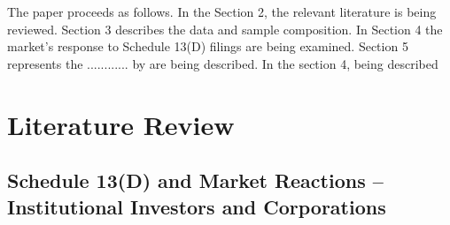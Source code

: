 \documentclass[12pt]{article}
\begin{document}
The paper proceeds as follows. In the Section 2, the relevant literature is being reviewed. Section 3 describes the data and sample composition. In Section 4 the market's response to Schedule 13(D) filings are being examined. Section 5 represents the ............
by  are being described.  In the section 4, being described 

\section{Literature Review}

\subsection{Schedule 13(D) and Market Reactions -- Institutional Investors and Corporations}
\end{document}
